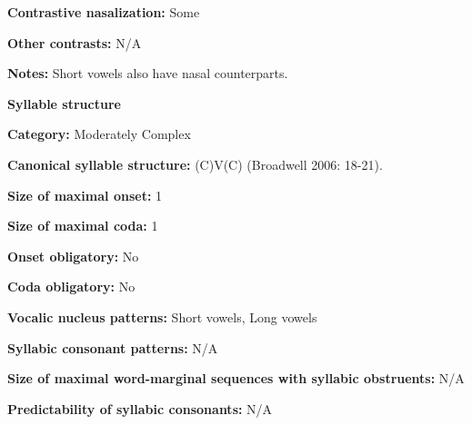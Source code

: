 \begin{styleBody}
\textbf{Contrastive nasalization:} Some
\end{styleBody}

\begin{styleBody}
\textbf{Other contrasts: }N/A
\end{styleBody}

\begin{styleBody}
\textbf{Notes:} Short vowels also have nasal counterparts.
\end{styleBody}

\begin{styleBody}
\textbf{Syllable structure}
\end{styleBody}

\begin{styleBody}
\textbf{Category:} Moderately Complex
\end{styleBody}

\begin{styleBody}
\textbf{Canonical syllable structure:} (C)V(C) (Broadwell 2006: 18-21).
\end{styleBody}

\begin{styleBody}
\textbf{Size of maximal onset:} 1
\end{styleBody}

\begin{styleBody}
\textbf{Size of maximal coda:} 1
\end{styleBody}

\begin{styleBody}
\textbf{Onset obligatory:} No
\end{styleBody}

\begin{styleBody}
\textbf{Coda obligatory:} No
\end{styleBody}

\begin{styleBody}
\textbf{Vocalic nucleus patterns:} Short vowels, Long vowels
\end{styleBody}

\begin{styleBody}
\textbf{Syllabic consonant patterns:} N/A
\end{styleBody}

\begin{styleBody}
\textbf{Size of maximal word{}-marginal sequences with syllabic obstruents:} N/A
\end{styleBody}

\begin{styleBody}
\textbf{Predictability of syllabic consonants:} N/A
\end{styleBody}

